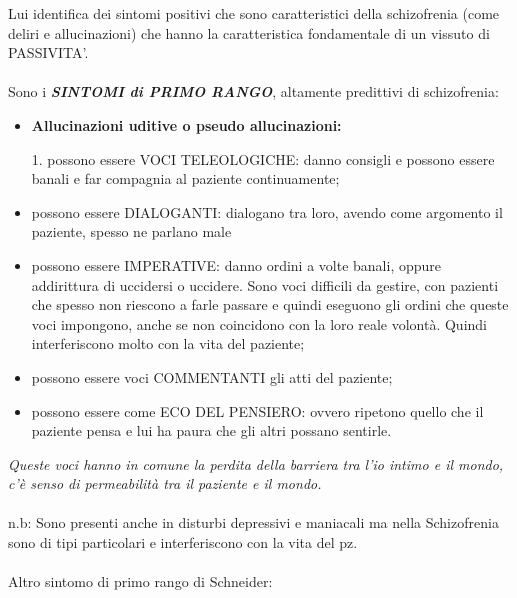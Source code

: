 Lui identifica dei sintomi positivi che sono caratteristici della
schizofrenia (come deliri e allucinazioni) che hanno la caratteristica
fondamentale di un vissuto di PASSIVITA'.
\\\\
Sono i \textbf{\emph{SINTOMI di PRIMO RANGO}}, altamente predittivi di
schizofrenia:

\begin{itemize}
\item
  \textbf{Allucinazioni uditive o pseudo allucinazioni: }
\end{itemize}

\begin{itemize}
\item[1.]
  possono essere VOCI TELEOLOGICHE: danno consigli e possono essere
  banali e far compagnia al paziente continuamente;
\item
  possono essere DIALOGANTI: dialogano tra loro, avendo come argomento
  il paziente, spesso ne parlano male
\item
  possono essere IMPERATIVE: danno ordini a volte banali, oppure
  addirittura di uccidersi o uccidere. Sono voci difficili da gestire,
  con pazienti che spesso non riescono a farle passare e quindi eseguono
  gli ordini che queste voci impongono, anche se non coincidono con la
  loro reale volontà. Quindi interferiscono molto con la vita del
  paziente;
\item
  possono essere voci COMMENTANTI gli atti del paziente;
\item
  possono essere come ECO DEL PENSIERO: ovvero ripetono quello che il
  paziente pensa e lui ha paura che gli altri possano sentirle.
\end{itemize}

\emph{Queste voci hanno in comune la perdita della barriera tra l'io
intimo e il mondo, c'è senso di permeabilità tra il paziente e il
mondo.}
\\\\
n.b: Sono presenti anche in disturbi depressivi e maniacali ma nella
Schizofrenia sono di tipi particolari e interferiscono con la vita del
pz.
\\\\
Altro sintomo di primo rango di Schneider:

